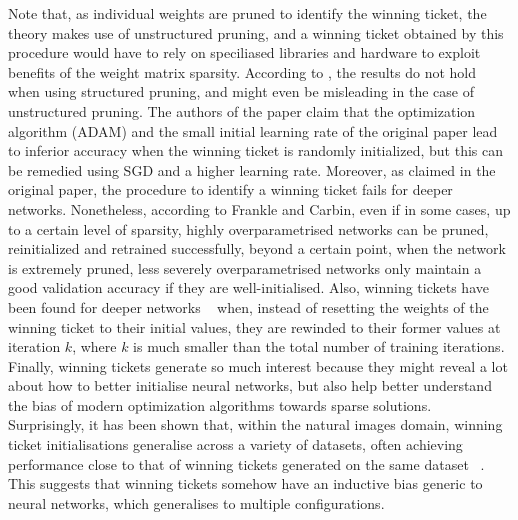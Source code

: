 Note that, as individual weights are pruned to identify the winning ticket, the theory makes use of unstructured pruning, and a winning ticket obtained by this procedure would have to rely on speciliased libraries and hardware to exploit benefits of the weight matrix sparsity. According to \cite{liu2018rethinking}, the results do not hold when using structured pruning, and might even be misleading in the case of unstructured pruning. The authors of the paper claim that the optimization algorithm (ADAM) and the small initial learning rate of the original paper lead to inferior accuracy when the winning ticket is randomly initialized, but this can be remedied using SGD and a higher learning rate. Moreover, as claimed in the original paper, the procedure to identify a winning ticket fails for deeper networks. Nonetheless, according to Frankle and Carbin, even if in some cases, up to a certain level of sparsity, highly overparametrised networks can be pruned, reinitialized and retrained successfully, beyond a certain point, when the network is extremely pruned, less severely overparametrised networks only maintain a good validation accuracy if they are well-initialised. Also, winning tickets have been found for deeper networks ~\autocite{frankle2019lottery} when, instead of resetting the weights of the winning ticket to their initial values, they are rewinded to their former values at iteration $k$, where $k$ is much smaller than the total number of training iterations. Finally, winning tickets generate so much interest because they might reveal a lot about how to better initialise neural networks, but also help better understand the bias of modern optimization algorithms towards sparse solutions. Surprisingly, it has been shown that, within the natural images domain, winning ticket initialisations generalise across a variety of datasets, often achieving performance close to that of winning tickets generated on the same dataset ~\autocite{morcos2019one}. This suggests that winning tickets somehow have an inductive bias generic to neural networks, which generalises to multiple configurations. 

